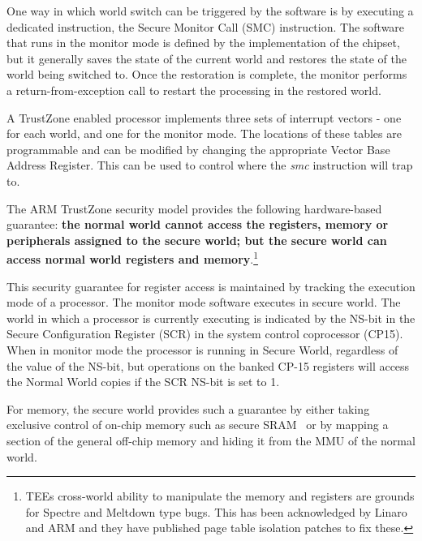 
One way in which world switch can be triggered by the software is by executing a dedicated instruction, the Secure Monitor Call (SMC) instruction. The software that runs in the monitor mode is defined by the implementation of the chipset, but it generally saves the state of the current world and restores the state of the world being switched to. Once the restoration is complete, the monitor performs a return-from-exception call to restart the processing in the restored world.  

A TrustZone enabled processor implements three sets of interrupt vectors - one for each world, and one for the monitor mode. The locations of these tables are programmable and can be modified by changing the appropriate Vector Base Address Register. This can be used to control where the \textit{smc} instruction will trap to. 

The ARM TrustZone security model provides the following hardware-based guarantee: 
\textbf{the normal world cannot access the registers, memory or peripherals assigned 
to the secure world; but the secure world can access normal world registers and memory}.\footnote{TEEs cross-world ability to manipulate the memory and registers are grounds for Spectre\cite{Kocher2018spectre} and Meltdown\cite{Lipp2018meltdown} type bugs. This has been acknowledged by Linaro and ARM and they have published page table isolation patches to fix these\cite{bech_biesheuvel_brown_thompson_2018}.} 

This security guarantee for register access is maintained by tracking the execution mode of a processor. The monitor mode software executes in secure world. The world in which a processor is currently executing is indicated by the NS-bit in the Secure Configuration Register (SCR) in the system control coprocessor (CP15). When in monitor mode the processor is running in Secure World, regardless of the value of the NS-bit, but operations on the banked CP-15 registers will access the Normal World copies if the SCR NS-bit is set to 1. 

For memory, the secure world provides such a guarantee by either taking exclusive control of on-chip 
memory such as secure SRAM~\cite{hikey} or by mapping a section of the general off-chip memory and hiding it 
from the MMU of the normal world.

